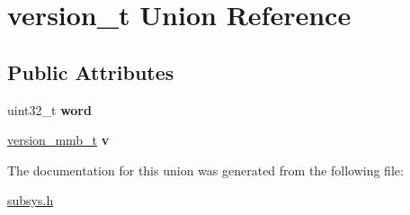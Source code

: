 \hypertarget{unionversion__t}{\section{version\+\_\+t Union Reference}
\label{unionversion__t}
}
\subsection*{Public Attributes}
\begin{DoxyCompactItemize}
\item 
\hypertarget{unionversion__t_a0e4f3c422432a7956db39572e7a15de7}{uint32\+\_\+t {\bfseries word}}\label{unionversion__t_a0e4f3c422432a7956db39572e7a15de7}

\item 
\hypertarget{unionversion__t_aecd36151c9c6ab410c499d37dcb9fc3e}{\hyperlink{structversion__mmb__t}{version\+\_\+mmb\+\_\+t} {\bfseries v}}\label{unionversion__t_aecd36151c9c6ab410c499d37dcb9fc3e}

\end{DoxyCompactItemize}


The documentation for this union was generated from the following file\+:\begin{DoxyCompactItemize}
\item 
\hyperlink{subsys_8h}{subsys.\+h}\end{DoxyCompactItemize}
